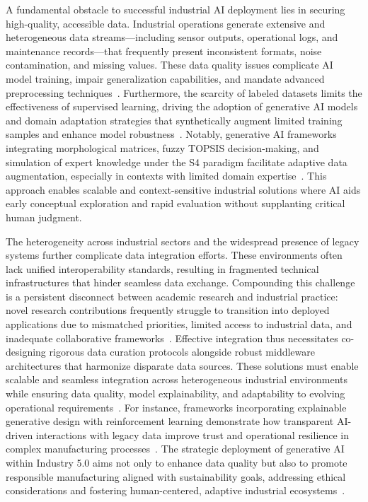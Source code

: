 \documentclass[sigconf]{acmart}
\begin{document}
A fundamental obstacle to successful industrial AI deployment lies in securing high-quality, accessible data. Industrial operations generate extensive and heterogeneous data streams—including sensor outputs, operational logs, and maintenance records—that frequently present inconsistent formats, noise contamination, and missing values. These data quality issues complicate AI model training, impair generalization capabilities, and mandate advanced preprocessing techniques~\cite{ref6,ref9}. Furthermore, the scarcity of labeled datasets limits the effectiveness of supervised learning, driving the adoption of generative AI models and domain adaptation strategies that synthetically augment limited training samples and enhance model robustness~\cite{ref2,ref3}. Notably, generative AI frameworks integrating morphological matrices, fuzzy TOPSIS decision-making, and simulation of expert knowledge under the S4 paradigm facilitate adaptive data augmentation, especially in contexts with limited domain expertise~\cite{ref2}. This approach enables scalable and context-sensitive industrial solutions where AI aids early conceptual exploration and rapid evaluation without supplanting critical human judgment.

The heterogeneity across industrial sectors and the widespread presence of legacy systems further complicate data integration efforts. These environments often lack unified interoperability standards, resulting in fragmented technical infrastructures that hinder seamless data exchange. Compounding this challenge is a persistent disconnect between academic research and industrial practice: novel research contributions frequently struggle to transition into deployed applications due to mismatched priorities, limited access to industrial data, and inadequate collaborative frameworks~\cite{ref3}. Effective integration thus necessitates co-designing rigorous data curation protocols alongside robust middleware architectures that harmonize disparate data sources. These solutions must enable scalable and seamless integration across heterogeneous industrial environments while ensuring data quality, model explainability, and adaptability to evolving operational requirements~\cite{ref6,ref9}. For instance, frameworks incorporating explainable generative design with reinforcement learning demonstrate how transparent AI-driven interactions with legacy data improve trust and operational resilience in complex manufacturing processes~\cite{ref9}. The strategic deployment of generative AI within Industry 5.0 aims not only to enhance data quality but also to promote responsible manufacturing aligned with sustainability goals, addressing ethical considerations and fostering human-centered, adaptive industrial ecosystems~\cite{ref6}.
\end{document}
